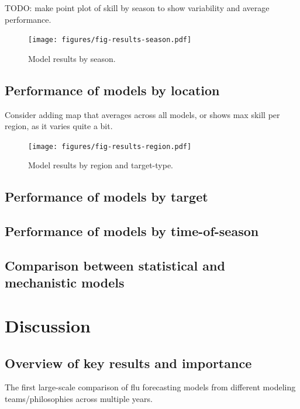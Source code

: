 \documentclass{article}
\begin{document}
TODO: make point plot of skill by season to show variability and average performance.

\begin{figure}[htbp]
\begin{center}
\texttt{[image: figures/fig-results-season.pdf]}
\caption{Model results by season.}
\label{fig:results-season}
\end{center}
\end{figure}

\subsection{Performance of models by location}

Consider adding map that averages across all models, or shows max skill per region, as it varies quite a bit.

\begin{figure}[htbp]
\begin{center}
\texttt{[image: figures/fig-results-region.pdf]}
\caption{Model results by region and target-type.}
\label{fig:results-region}
\end{center}
\end{figure}

\subsection{Performance of models by target}


\subsection{Performance of models by time-of-season}


\subsection{Comparison between statistical and mechanistic models}


\section{Discussion}

\subsection{Overview of key results and importance}
The first large-scale comparison of flu forecasting models from different modeling teams/philosophies across multiple years.
\end{document}
